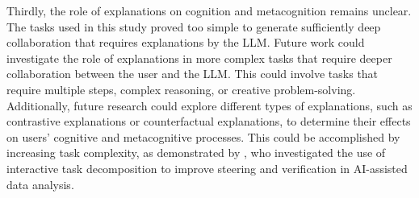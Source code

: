Thirdly, the role of explanations on cognition and metacognition remains unclear. The tasks used in this study proved too simple to generate sufficiently deep collaboration that requires explanations by the LLM. Future work could investigate the role of explanations in more complex tasks that require deeper collaboration between the user and the LLM. This could involve tasks that require multiple steps, complex reasoning, or creative problem-solving. Additionally, future research could explore different types of explanations, such as contrastive explanations or counterfactual explanations, to determine their effects on users' cognitive and metacognitive processes. This could be accomplished by increasing task complexity, as demonstrated by \cite{Kazemitabaar2024}, who investigated the use of interactive task decomposition to improve steering and verification in AI-assisted data analysis.
